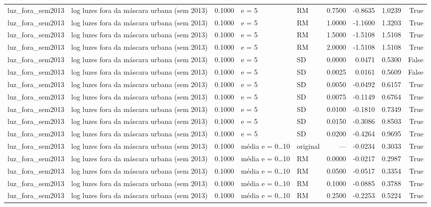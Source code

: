 \begin{table}
{\begin{tabular}{llrllrrrr}
luz\_fora\_sem2013 & log luzes fora da máscara urbana (sem 2013) & 0.1000 & e = 5 & RM & 0.7500 & -0.8635 & 1.0239 & True \\
luz\_fora\_sem2013 & log luzes fora da máscara urbana (sem 2013) & 0.1000 & e = 5 & RM & 1.0000 & -1.1600 & 1.3203 & True \\
luz\_fora\_sem2013 & log luzes fora da máscara urbana (sem 2013) & 0.1000 & e = 5 & RM & 1.5000 & -1.5108 & 1.5108 & True \\
luz\_fora\_sem2013 & log luzes fora da máscara urbana (sem 2013) & 0.1000 & e = 5 & RM & 2.0000 & -1.5108 & 1.5108 & True \\
luz\_fora\_sem2013 & log luzes fora da máscara urbana (sem 2013) & 0.1000 & e = 5 & SD & 0.0000 & 0.0471 & 0.5300 & False \\
luz\_fora\_sem2013 & log luzes fora da máscara urbana (sem 2013) & 0.1000 & e = 5 & SD & 0.0025 & 0.0161 & 0.5609 & False \\
luz\_fora\_sem2013 & log luzes fora da máscara urbana (sem 2013) & 0.1000 & e = 5 & SD & 0.0050 & -0.0492 & 0.6157 & True \\
luz\_fora\_sem2013 & log luzes fora da máscara urbana (sem 2013) & 0.1000 & e = 5 & SD & 0.0075 & -0.1149 & 0.6764 & True \\
luz\_fora\_sem2013 & log luzes fora da máscara urbana (sem 2013) & 0.1000 & e = 5 & SD & 0.0100 & -0.1810 & 0.7349 & True \\
luz\_fora\_sem2013 & log luzes fora da máscara urbana (sem 2013) & 0.1000 & e = 5 & SD & 0.0150 & -0.3086 & 0.8503 & True \\
luz\_fora\_sem2013 & log luzes fora da máscara urbana (sem 2013) & 0.1000 & e = 5 & SD & 0.0200 & -0.4264 & 0.9695 & True \\
luz\_fora\_sem2013 & log luzes fora da máscara urbana (sem 2013) & 0.1000 & média e = 0…10 & original & — & -0.0234 & 0.3033 & True \\
luz\_fora\_sem2013 & log luzes fora da máscara urbana (sem 2013) & 0.1000 & média e = 0…10 & RM & 0.0000 & -0.0217 & 0.2987 & True \\
luz\_fora\_sem2013 & log luzes fora da máscara urbana (sem 2013) & 0.1000 & média e = 0…10 & RM & 0.0500 & -0.0517 & 0.3354 & True \\
luz\_fora\_sem2013 & log luzes fora da máscara urbana (sem 2013) & 0.1000 & média e = 0…10 & RM & 0.1000 & -0.0885 & 0.3788 & True \\
luz\_fora\_sem2013 & log luzes fora da máscara urbana (sem 2013) & 0.1000 & média e = 0…10 & RM & 0.2500 & -0.2253 & 0.5224 & True \\

\end{tabular}}
\end{table}
